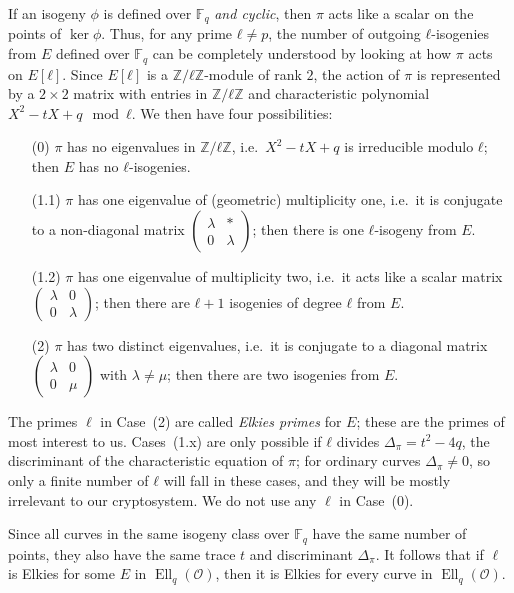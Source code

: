 \documentclass{llncs}
\newcommand{\F}{\mathbb{F}}
\renewcommand{\O}{\mathcal{O}}
\DeclareMathOperator{\Ell}{Ell}
\begin{document}
If an isogeny $ϕ$ is defined over $\F_q$ \emph{and cyclic},
then $π$ acts like a scalar on the points of $\ker ϕ$. 
Thus, for any prime $ℓ≠p$, the number of outgoing $ℓ$-isogenies from $E$ 
defined over $\F_q$ can be
completely understood by looking at how $π$ acts on $E[ℓ]$. Since $E[ℓ]$
is a $ℤ/ℓℤ$-module of rank $2$, the action of $π$ is represented by a
$2×2$ matrix with entries in $ℤ/ℓℤ$ and characteristic polynomial
$X^2-tX+q\mod ℓ$. We then have four possibilities:
\begin{itemize}
\item[(0)] $π$ has no eigenvalues in $ℤ/ℓℤ$, i.e.\ $X^2-tX+q$ is
  irreducible modulo $ℓ$; then $E$ has no $ℓ$-isogenies.
\item[(1.1)] $π$ has one eigenvalue of (geometric) multiplicity one,
  i.e.\ it is conjugate to a non-diagonal matrix
  $\left(\begin{smallmatrix}λ&*\\0&λ\end{smallmatrix}\right)$; then
  there is one $ℓ$-isogeny from $E$.
\item[(1.2)] $π$ has one eigenvalue of multiplicity two, i.e.\ it acts
  like a scalar matrix
  $\left(\begin{smallmatrix}λ&0\\0&λ\end{smallmatrix}\right)$; then
  there are $ℓ+1$ isogenies of degree $ℓ$ from $E$.
\item[(2)] $π$ has two distinct eigenvalues, i.e.\ it is conjugate to a
  diagonal matrix
  $\left(\begin{smallmatrix}λ&0\\0&μ\end{smallmatrix}\right)$
	with $\lambda\neq\mu$; then
  there are two isogenies from $E$.
\end{itemize}

The primes $\ell$ in Case~(2)
are called \emph{Elkies primes} for $E$;
these are the primes of most interest to us.
Cases~(1.x) are only possible if $ℓ$ divides $Δ_π = t^2-4q$,
the discriminant of the characteristic equation of $π$;
for ordinary curves $Δ_π≠0$, so only a finite number
of $ℓ$ will fall in these cases, and they will be mostly
irrelevant to our cryptosystem.
We do not use any $\ell$ in Case~(0).

Since all curves in
the same isogeny class over $\F_q$ have the same number of points,
they also have the same trace $t$ and discriminant $Δ_π$.
It follows that if $\ell$ is Elkies for some $E$ in $\Ell_q(\O)$,
then it is Elkies for every curve in $\Ell_q(\O)$.
\end{document}
